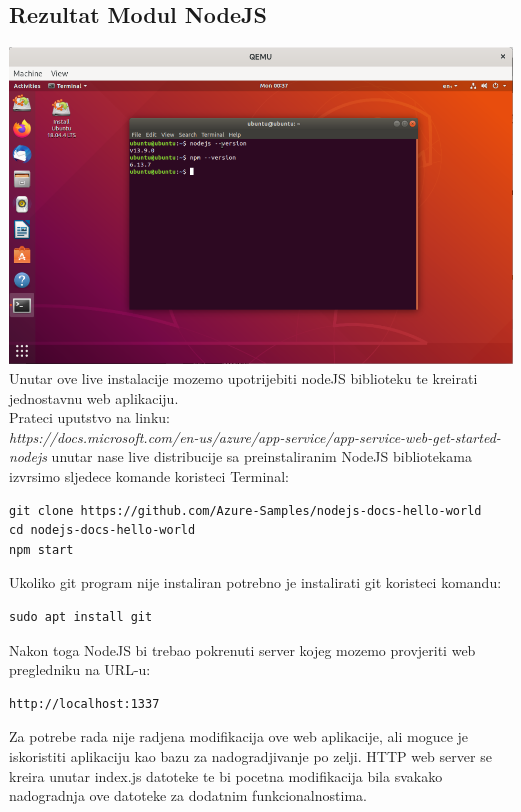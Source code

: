\documentclass[12pt,vi]{mitthesis}
\begin{document}
\subsection*{Rezultat Modul NodeJS}
\includegraphics[width=\linewidth]{images/ModulNodeJSUbuntu.png} 
Unutar ove live instalacije mozemo upotrijebiti nodeJS biblioteku te kreirati jednostavnu web aplikaciju.\\
Prateci uputstvo na linku:\\
\textit{https://docs.microsoft.com/en-us/azure/app-service/app-service-web-get-started-nodejs}
unutar nase live distribucije sa preinstaliranim NodeJS bibliotekama izvrsimo sljedece komande koristeci Terminal:
\begin{lstlisting}[style=BashInputStyle]
git clone https://github.com/Azure-Samples/nodejs-docs-hello-world
cd nodejs-docs-hello-world
npm start
\end{lstlisting}
Ukoliko git program nije instaliran potrebno je instalirati git koristeci komandu:
\begin{lstlisting}[style=BashInputStyle]
sudo apt install git
\end{lstlisting}
Nakon toga NodeJS bi trebao pokrenuti server kojeg mozemo provjeriti web pregledniku na URL-u:
\begin{lstlisting}[style=BashInputStyle]
http://localhost:1337
\end{lstlisting}
Za potrebe rada nije radjena modifikacija ove web aplikacije, ali moguce je iskoristiti aplikaciju kao bazu za nadogradjivanje po zelji. HTTP web server se kreira unutar index.js datoteke te bi pocetna modifikacija bila svakako nadogradnja ove datoteke za dodatnim funkcionalnostima.\\
\end{document}
